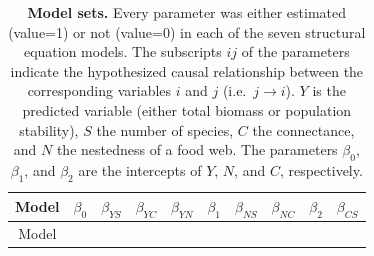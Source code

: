 \documentclass[10pt,oneside]{article}
\begin{document}
\hypertarget{tbl:models}{}
\begin{longtable}[]{@{}cccccccccc@{}}
\caption{\label{tbl:models}\textbf{Model sets.} Every parameter was
either estimated (value=1) or not (value=0) in each of the seven
structural equation models. The subscripts \({ij}\) of the parameters
indicate the hypothesized causal relationship between the corresponding
variables \(i\) and \(j\) (i.e.~\(j \rightarrow i\)). \(Y\) is the
predicted variable (either total biomass or population stability), \(S\)
the number of species, \(C\) the connectance, and \(N\) the nestedness
of a food web. The parameters \(\beta_0\), \(\beta_1\), and \(\beta_2\)
are the intercepts of \(Y\), \(N\), and \(C\),
respectively.}\tabularnewline
\toprule
\begin{minipage}[b]{0.15\columnwidth}\centering
Model\strut
\end{minipage} & \begin{minipage}[b]{0.07\columnwidth}\centering
\(\beta_0\)\strut
\end{minipage} & \begin{minipage}[b]{0.07\columnwidth}\centering
\(\beta_{YS}\)\strut
\end{minipage} & \begin{minipage}[b]{0.07\columnwidth}\centering
\(\beta_{YC}\)\strut
\end{minipage} & \begin{minipage}[b]{0.07\columnwidth}\centering
\(\beta_{YN}\)\strut
\end{minipage} & \begin{minipage}[b]{0.07\columnwidth}\centering
\(\beta_1\)\strut
\end{minipage} & \begin{minipage}[b]{0.07\columnwidth}\centering
\(\beta_{NS}\)\strut
\end{minipage} & \begin{minipage}[b]{0.07\columnwidth}\centering
\(\beta_{NC}\)\strut
\end{minipage} & \begin{minipage}[b]{0.07\columnwidth}\centering
\(\beta_2\)\strut
\end{minipage} & \begin{minipage}[b]{0.07\columnwidth}\centering
\(\beta_{CS}\)\strut
\end{minipage}\tabularnewline
\midrule
\endfirsthead
\toprule
\begin{minipage}[b]{0.15\columnwidth}\centering
Model\strut
\end{minipage} & \begin{minipage}[b]{0.07\columnwidth}\centering

\end{minipage}
\end{longtable}
\end{document}
